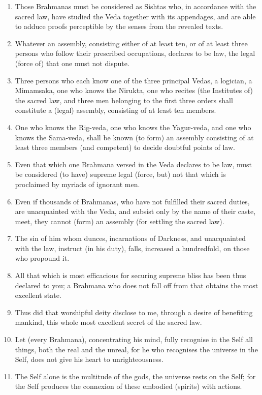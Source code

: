 \begin{enumerate}
\item Those Brahmanas must be considered as Sishtas who, in accordance with the sacred law, have studied the Veda together with its appendages, and are able to adduce proofs perceptible by the senses from the revealed texts.
\item Whatever an assembly, consisting either of at least ten, or of at least three persons who follow their prescribed occupations, declares to be law, the legal (force of) that one must not dispute.
\item Three persons who each know one of the three principal Vedas, a logician, a Mimamsaka, one who knows the Nirukta, one who recites (the Institutes of) the sacred law, and three men belonging to the first three orders shall constitute a (legal) assembly, consisting of at least ten members.
\item One who knows the Rig-veda, one who knows the Yagur-veda, and one who knows the Sama-veda, shall be known (to form) an assembly consisting of at least three members (and competent) to decide doubtful points of law.
\item Even that which one Brahmana versed in the Veda declares to be law, must be considered (to have) supreme legal (force, but) not that which is proclaimed by myriads of ignorant men.
\item Even if thousands of Brahmanas, who have not fulfilled their sacred duties, are unacquainted with the Veda, and subsist only by the name of their caste, meet, they cannot (form) an assembly (for settling the sacred law).
\item The sin of him whom dunces, incarnations of Darkness, and unacquainted with the law, instruct (in his duty), falls, increased a hundredfold, on those who propound it.
\item All that which is most efficacious for securing supreme bliss has been thus declared to you; a Brahmana who does not fall off from that obtains the most excellent state.
\item Thus did that worshipful deity disclose to me, through a desire of benefiting mankind, this whole most excellent secret of the sacred law.
\item Let (every Brahmana), concentrating his mind, fully recognise in the Self all things, both the real and the unreal, for he who recognises the universe in the Self, does not give his heart to unrighteousness.
\item The Self alone is the multitude of the gods, the universe rests on the Self; for the Self produces the connexion of these embodied (spirits) with actions.

\end{enumerate}
